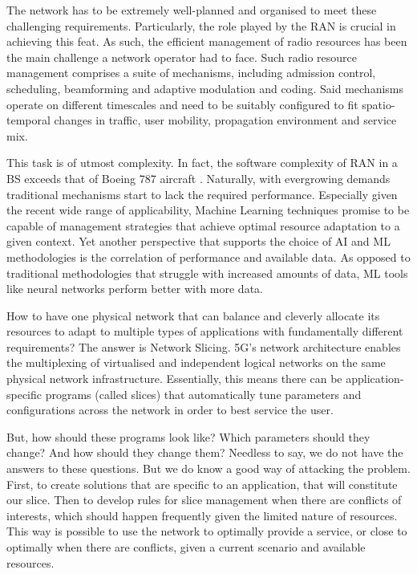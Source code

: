 The network has to be extremely well-planned and organised to meet these challenging requirements. Particularly, the role played by the \ac{RAN} is crucial in achieving this feat. As such, the efficient management of radio resources has been the main challenge a network operator had to face. Such radio resource management comprises a suite of mechanisms, including admission control, scheduling, beamforming and adaptive modulation and coding. Said mechanisms operate on different timescales and need to be suitably configured to fit spatio-temporal changes in traffic, user mobility, propagation environment and service mix.

This task is of utmost complexity. In fact, the software complexity of \ac{RAN} in a \ac{BS} exceeds that of Boeing 787 aircraft \cite{5facts_ericsson}. Naturally, with evergrowing demands traditional mechanisms start to lack the required performance. Especially given the recent wide range of applicability, Machine Learning techniques promise to be capable of management strategies that achieve optimal resource adaptation to a given context. Yet another perspective that supports the choice of \ac{AI} and \ac{ML} methodologies is the correlation of performance and available data. As opposed to traditional methodologies that struggle with increased amounts of data, \ac{ML} tools like neural networks perform better with more data.


How to have one physical network that can balance and cleverly allocate its resources to adapt to multiple types of applications with fundamentally different requirements? The answer is Network Slicing. \ac{5G}'s network architecture enables the multiplexing of virtualised and independent logical networks on the same physical network infrastructure. Essentially, this means there can be application-specific programs (called slices) that automatically tune parameters and configurations across the network in order to best service the user.

But, how should these programs look like? Which parameters should they change? And how should they change them? Needless to say, we do not have the answers to these questions. But we do know a good way of attacking the problem. First, to create solutions that are specific to an application, that will constitute our slice. Then to develop rules for slice management when there are conflicts of interests, which should happen frequently given the limited nature of resources. This way is possible to use the network to optimally provide a service, or close to optimally when there are conflicts, given a current scenario and available resources.

